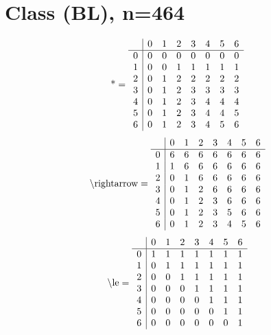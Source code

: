 \documentclass[11pt]{article}
\begin{document}
\section{Class (BL), n=464}
\[\text{*} = 
\begin{array}{r | r r r r r r r}
 & 0 & 1 & 2 & 3 & 4 & 5 & 6 \\ \hline
0 & 0 & 0 & 0 & 0 & 0 & 0 & 0 \\
1 & 0 & 0 & 1 & 1 & 1 & 1 & 1 \\
2 & 0 & 1 & 2 & 2 & 2 & 2 & 2 \\
3 & 0 & 1 & 2 & 3 & 3 & 3 & 3 \\
4 & 0 & 1 & 2 & 3 & 4 & 4 & 4 \\
5 & 0 & 1 & 2 & 3 & 4 & 4 & 5 \\
6 & 0 & 1 & 2 & 3 & 4 & 5 & 6 \\
\end{array}
\]
\[\text{\textbackslash rightarrow} = 
\begin{array}{r | r r r r r r r}
 & 0 & 1 & 2 & 3 & 4 & 5 & 6 \\ \hline
0 & 6 & 6 & 6 & 6 & 6 & 6 & 6 \\
1 & 1 & 6 & 6 & 6 & 6 & 6 & 6 \\
2 & 0 & 1 & 6 & 6 & 6 & 6 & 6 \\
3 & 0 & 1 & 2 & 6 & 6 & 6 & 6 \\
4 & 0 & 1 & 2 & 3 & 6 & 6 & 6 \\
5 & 0 & 1 & 2 & 3 & 5 & 6 & 6 \\
6 & 0 & 1 & 2 & 3 & 4 & 5 & 6 \\
\end{array}
\]
\[\text{\textbackslash le} = 
\begin{array}{r | r r r r r r r}
 & 0 & 1 & 2 & 3 & 4 & 5 & 6 \\ \hline
0 & 1 & 1 & 1 & 1 & 1 & 1 & 1 \\
1 & 0 & 1 & 1 & 1 & 1 & 1 & 1 \\
2 & 0 & 0 & 1 & 1 & 1 & 1 & 1 \\
3 & 0 & 0 & 0 & 1 & 1 & 1 & 1 \\
4 & 0 & 0 & 0 & 0 & 1 & 1 & 1 \\
5 & 0 & 0 & 0 & 0 & 0 & 1 & 1 \\
6 & 0 & 0 & 0 & 0 & 0 & 0 & 1 \\
\end{array}
\]
\end{document}
